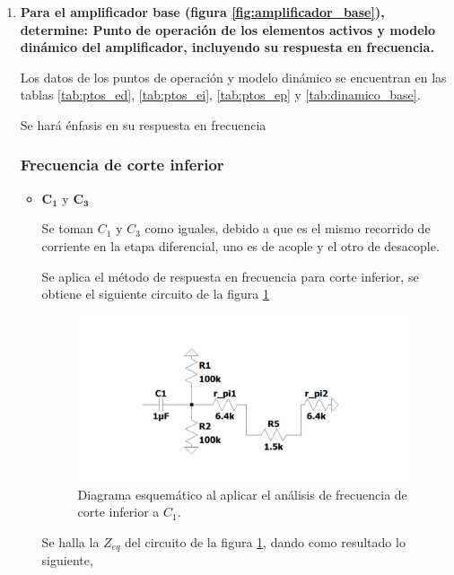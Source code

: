 \begin{enumerate}
  \item \textbf{Para el amplificador base (figura \ref{fig:amplificador_base}), determine: Punto
          de operación de los elementos activos y modelo dinámico del amplificador, incluyendo su respuesta en frecuencia.}

        Los datos de los puntos de operación y modelo dinámico se encuentran en las tablas \ref{tab:ptos_ed}, \ref{tab:ptos_ei}, \ref{tab:ptos_ep} y \ref{tab:dinamico_base}.

        Se hará énfasis en su respuesta en frecuencia

        \subsubsection{Frecuencia de corte inferior}

        \begin{itemize}
          \item $\mathbf{C_1}$ y $\mathbf{C_3}$

                Se toman $C_1$ y $C_3$ como iguales, debido a que es el mismo recorrido de corriente en la etapa diferencial, uno es de acople y el otro de desacople.

                Se aplica el método de respuesta en frecuencia para corte inferior, se obtiene el siguiente circuito de la figura \ref{fig:c1}
                \begin{figure}[H]
                  \centering
                  \includegraphics[width=12cm]{Imagenes/c1.png}
                  \caption{Diagrama esquemático al aplicar el análisis de frecuencia de corte inferior a $C_1$.}
                  \label{fig:c1}
                \end{figure}

                Se halla la $Z_{eq}$ del circuito de la figura \ref{fig:c1}, dando como resultado lo siguiente,


\end{itemize}
\end{enumerate}
